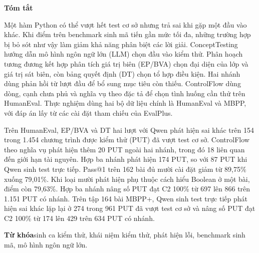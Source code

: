 \begin{center}
\textbf{\large Tóm tắt}
\end{center}
\begin{small}

Một hàm Python có thể vượt hết test cơ sở nhưng trả sai khi gặp một đầu vào khác. Khi điểm trên benchmark sinh mã tiến gần mức tối đa, những trường hợp bị bỏ sót như vậy làm giảm khả năng phân biệt các lời giải. ConceptTesting hướng dẫn mô hình ngôn ngữ lớn (LLM) chọn đầu vào kiểm thử. Phân hoạch tương đương kết hợp phân tích giá trị biên (EP/BVA) chọn đại diện của lớp và giá trị sát biên, còn bảng quyết định (DT) chọn tổ hợp điều kiện. Hai nhánh dùng phản hồi từ lượt đầu để bổ sung mục tiêu còn thiếu. ControlFlow dùng dòng, cạnh chưa phủ và nghĩa vụ theo đặc tả để chọn tình huống cần thử trên HumanEval. Thực nghiệm dùng hai bộ dữ liệu chính là HumanEval và MBPP, với đáp án lấy từ các cài đặt tham chiếu của EvalPlus.

Trên HumanEval, EP/BVA và DT hai lượt với Qwen phát hiện sai khác trên 154 trong 1.454 chương trình được kiểm thử (PUT) đã vượt test cơ sở. ControlFlow theo nghĩa vụ phát hiện thêm 20 PUT ngoài hai nhánh, trong đó 18 liên quan đến giới hạn tài nguyên. Hợp ba nhánh phát hiện 174 PUT, so với 87 PUT khi Qwen sinh test trực tiếp. Pass@1 trên 162 bài đủ mười cài đặt giảm từ 89,75\% xuống 79,01\%. Khi loại mười phát hiện phụ thuộc cách hiểu Boolean ở một bài, điểm còn 79,63\%. Hợp ba nhánh nâng số PUT đạt C2 100\% từ 697 lên 866 trên 1.151 PUT có nhánh. Trên tập 164 bài MBPP+, Qwen sinh test trực tiếp phát hiện sai khác lặp lại ở 274 trong 961 PUT đã vượt test cơ sở và nâng số PUT đạt C2 100\% từ 174 lên 429 trên 634 PUT có nhánh.

\vspace*{.6cm}
\textbf{Từ khóa}\quad sinh ca kiểm thử, khái niệm kiểm thử, phát hiện lỗi, benchmark sinh mã, mô hình ngôn ngữ lớn.

\end{small}
